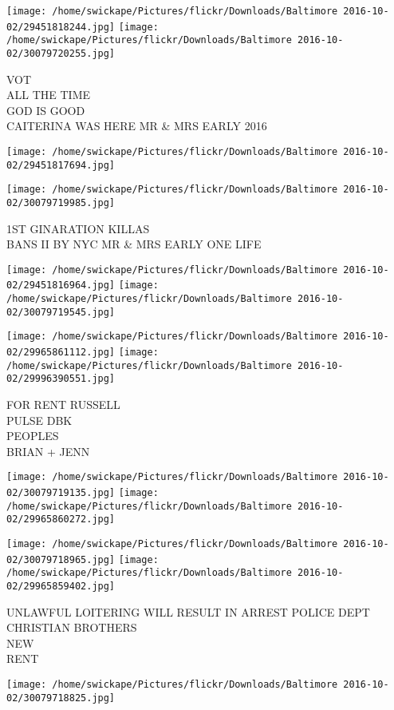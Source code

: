 \documentclass[10pt,letterpaper]{article}
\begin{document}
\texttt{[image: /home/swickape/Pictures/flickr/Downloads/Baltimore 2016-10-02/29451818244.jpg]}
\texttt{[image: /home/swickape/Pictures/flickr/Downloads/Baltimore 2016-10-02/30079720255.jpg]}

VOT\\
ALL THE TIME\\
GOD IS GOOD\\
CAITERINA WAS HERE MR \& MRS EARLY 2016
\pagebreak

\texttt{[image: /home/swickape/Pictures/flickr/Downloads/Baltimore 2016-10-02/29451817694.jpg]}

\vspace{0.25in}
\texttt{[image: /home/swickape/Pictures/flickr/Downloads/Baltimore 2016-10-02/30079719985.jpg]}

1ST GINARATION KILLAS\\
BANS II BY NYC MR \& MRS EARLY ONE LIFE
\pagebreak

\texttt{[image: /home/swickape/Pictures/flickr/Downloads/Baltimore 2016-10-02/29451816964.jpg]}
\texttt{[image: /home/swickape/Pictures/flickr/Downloads/Baltimore 2016-10-02/30079719545.jpg]}

\texttt{[image: /home/swickape/Pictures/flickr/Downloads/Baltimore 2016-10-02/29965861112.jpg]}
\texttt{[image: /home/swickape/Pictures/flickr/Downloads/Baltimore 2016-10-02/29996390551.jpg]}

FOR RENT RUSSELL\\
PULSE DBK\\
PEOPLES\\
BRIAN + JENN
\pagebreak

\texttt{[image: /home/swickape/Pictures/flickr/Downloads/Baltimore 2016-10-02/30079719135.jpg]}
\texttt{[image: /home/swickape/Pictures/flickr/Downloads/Baltimore 2016-10-02/29965860272.jpg]}

\texttt{[image: /home/swickape/Pictures/flickr/Downloads/Baltimore 2016-10-02/30079718965.jpg]}
\texttt{[image: /home/swickape/Pictures/flickr/Downloads/Baltimore 2016-10-02/29965859402.jpg]}

UNLAWFUL LOITERING WILL RESULT IN ARREST POLICE DEPT\\
CHRISTIAN BROTHERS\\
NEW\\
RENT
\pagebreak

\texttt{[image: /home/swickape/Pictures/flickr/Downloads/Baltimore 2016-10-02/30079718825.jpg]}
\end{document}
